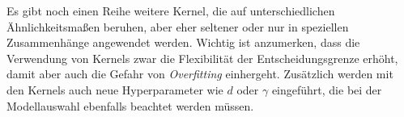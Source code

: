 \documentclass[
]{article}
\begin{document}
Es gibt noch einen Reihe weitere Kernel, die auf unterschiedlichen
Ähnlichkeitsmaßen beruhen, aber eher seltener oder nur in speziellen
Zusammenhänge angewendet werden. Wichtig ist anzumerken, dass die
Verwendung von Kernels zwar die Flexibilität der Entscheidungsgrenze
erhöht, damit aber auch die Gefahr von \textit{Overfitting} einhergeht.
Zusätzlich werden mit den Kernels auch neue Hyperparameter wie \(d\)
oder \(\gamma\) eingeführt, die bei der Modellauswahl ebenfalls beachtet
werden müssen.

\printbibliography
\end{document}
